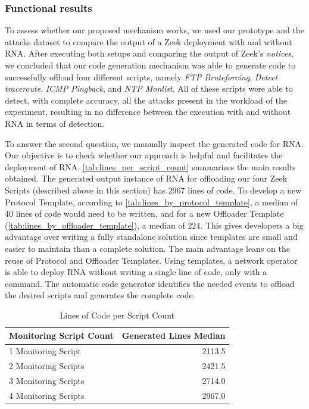 \subsubsection*{Functional results}

To assess whether our proposed mechanism works, we used our prototype and the attacks dataset to compare the output of a Zeek deployment with and without RNA. After executing both setups and comparing the output of Zeek's \textit{notices}, we concluded that our code generation mechanism was able to generate code to successfully offload four different scripts, namely \textit{FTP Bruteforcing}, \textit{Detect traceroute}, \textit{ICMP Pingback}, and \textit{NTP Monlist}. All of these scripts were able to detect, with complete accuracy, all the attacks present in the workload of the experiment, resulting in no difference between the execution with and without RNA in terms of detection.

To answer the second question, we manually inspect the generated code for RNA. Our objective is to check whether our approach is helpful and facilitates the deployment of RNA. \autoref{tab:lines_per_script_count} summarizes the main results obtained. The generated output instance of RNA for offloading our four Zeek Scripts (described above in this section) has $2967$ lines of code. To develop a new Protocol Template, according to \autoref{tab:lines_by_protocol_template}, a median of $40$ lines of code would need to be written, and for a new Offloader Template (\autoref{tab:lines_by_offloader_template}), a median of $224$. This gives developers a big advantage over writing a fully standalone solution since templates are small and easier to maintain than a complete solution. The main advantage leans on the reuse of Protocol and Offloader Templates. Using templates, a network operator is able to deploy RNA without writing a single line of code, only with a command. The automatic code generator identifies the needed events to offload the desired scripts and generates the complete code.


\begin{table}[htb]
    \caption{Lines of Code per Script Count}
    \begin{center}
        \begin{tabular}{|l|r|}
            \hline
            \textbf{Monitoring Script Count} & \multicolumn{1}{l|}{\textbf{Generated Lines Median}} \\ \hline
            1 Monitoring Script              & 2113.5                                             \\ \hline
            2 Monitoring Scripts             & 2421.5                                             \\ \hline
            3 Monitoring Scripts             & 2714.0                                             \\ \hline
            4 Monitoring Scripts             & 2967.0                                             \\ \hline
        \end{tabular}%
    \end{center}
    \label{tab:lines_per_script_count}
\end{table}

